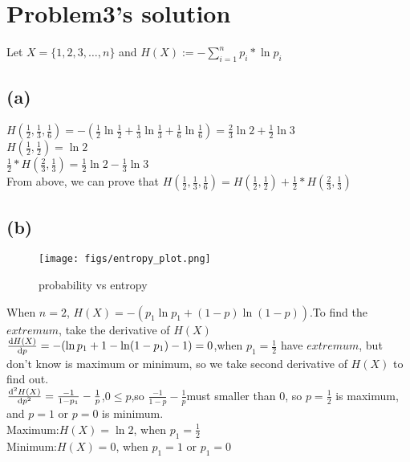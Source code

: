 \documentclass[a4paper,11pt]{article} %
\begin{document}
\section{Problem3's solution}
Let $X=\{1,2,3,\dots ,n\}$ and $H(X):=-\sum_{i=1}^{n}p_i*\ln p_i$
\subsection{(a)}
$H(\frac{1}{2}, \frac{1}{3}, \frac{1}{6})=-(\frac{1}{2}\ln \frac{1}{2}+\frac{1}{3}\ln \frac{1}{3}+\frac{1}{6}\ln \frac{1}{6})=\frac{2}{3} \ln 2+\frac{1}{2}\ln3$\\
$H(\frac{1}{2},\frac{1}{2})=\ln2$\\
$\frac{1}{2}*H(\frac{2}{3}, \frac{1}{3})=\frac{1}{2} \ln2 - \frac{1}{3} \ln3$\\
From above, we can prove that $H(\frac{1}{2}, \frac{1}{3}, \frac{1}{6})=H(\frac{1}{2},\frac{1}{2})+\frac{1}{2}*H(\frac{2}{3}, \frac{1}{3})$

\subsection{(b)}
\begin{figure}
    \centering
    \texttt{[image: figs/entropy\_plot.png]}
    \caption{probability vs entropy}
    \label{probability vs entropy}
\end{figure}
When $n=2$, $H(X)=-(p_1 \ln p_1 + (1-p)\ln (1-p))$.To find the $extremum$, take the derivative of $H(X)$\\
$\odv{H(X)}{p}=-(\ln p_1+1-\ln (1-p_1)-1)=0$,when $p_1= \frac{1}{2}$ have $extremum$, but don't know is maximum or minimum, so we take second derivative of $H(X)$ to find out.\\
$\odv[order=2]{H(X)}{p}=\frac{-1}{1-p_1}-\frac{1}{p}$,$0 \leq p$,so $\frac{-1}{1-p}-\frac{1}{p}$must smaller than 0, so $p=\frac{1}{2}$ is maximum, and $p=1$ or $p=0$ is minimum.\\
Maximum:$H(X)=\ln2$, when $p_1 = \frac{1}{2}$\\
Minimum:$H(X)=0$, when $p_1 = 1$ or $p_1=0$\\
\end{document}
